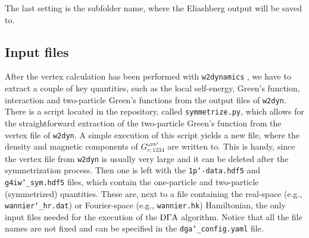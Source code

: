 \documentclass[../../main.tex]{subfiles}
\begin{document}
The last setting is the subfolder name, where the Eliashberg output will be saved to.
 
\subsection{Input files}

After the vertex calculation has been performed with \texttt{w2dynamics} \cite{w2dyn}, we have to extract a couple of key quantities, such as the local self-energy, Green's function, interaction and two-particle Green's functions from the output files of \texttt{w2dyn}. There is a script located in the repository, called \texttt{symmetrize.py}, which allows for the straightforward extraction of the two-particle Green's function from the vertex file of \texttt{w2dyn}. A simple execution of this script yields a new file, where the density and magnetic components of $G^{\omega\nu\nu'}_{r;\mathfrak{1234}}$ are written to. This is handy, since the vertex file from \texttt{w2dyn} is usually very large and it can be deleted after the symmetrization process. Then one is left with the \texttt{1p\char`-data.hdf5} and \texttt{g4iw\char`_sym.hdf5} files, which contain the one-particle and two-particle (symmetrized) quantities. These are, next to a file containing the real-space (e.g., \texttt{wannier\char`_hr.dat}) or Fourier-space (e.g., \texttt{wannier.hk}) Hamiltonian, the only input files needed for the execution of the $\text{D}\Gamma\text{A}$ algorithm. Notice that all the file names are not fixed and can be specified in the \texttt{dga\char`_config.yaml} file.
\end{document}
